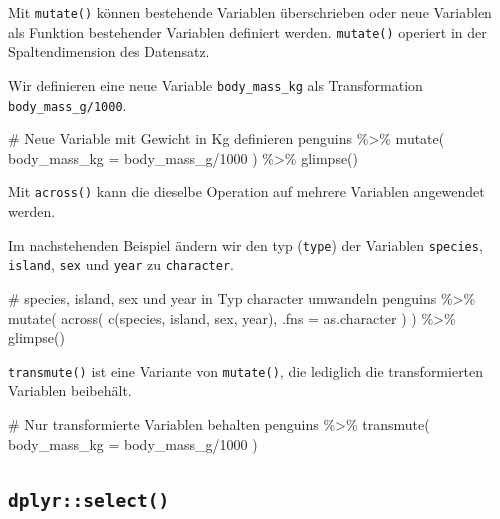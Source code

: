\documentclass[
  a4paper,
  DIV=11,
  oneside]{scrreprt}
\newenvironment{Shaded}{\begin{snugshade}}{\end{snugshade}}
\newcommand{\NormalTok}[1]{\textcolor[rgb]{0.00,0.23,0.31}{#1}}
\begin{document}
Mit \texttt{mutate()} können bestehende Variablen überschrieben oder
neue Variablen als Funktion bestehender Variablen definiert werden.
\texttt{mutate()} operiert in der Spaltendimension des Datensatz.

Wir definieren eine neue Variable \texttt{body\_mass\_kg} als
Transformation \texttt{body\_mass\_g/1000}.

\begin{Shaded}
\begin{Highlighting}[]
\NormalTok{\# Neue Variable mit Gewicht in Kg definieren}
\NormalTok{penguins \%\textgreater{}\% }
\NormalTok{  mutate(}
\NormalTok{    body\_mass\_kg = body\_mass\_g/1000}
\NormalTok{  ) \%\textgreater{}\%}
\NormalTok{  glimpse()}
\end{Highlighting}
\end{Shaded}

Mit \texttt{across()} kann die dieselbe Operation auf mehrere Variablen
angewendet werden.

Im nachstehenden Beispiel ändern wir den typ (\texttt{type}) der
Variablen \texttt{species}, \texttt{island}, \texttt{sex} und
\texttt{year} zu \texttt{character}.

\begin{Shaded}
\begin{Highlighting}[]
\NormalTok{\# species, island, sex und year in Typ \textquotesingle{}character\textquotesingle{} umwandeln}
\NormalTok{penguins \%\textgreater{}\% }
\NormalTok{  mutate(}
\NormalTok{    across(}
\NormalTok{      c(species, island, sex, year), }
\NormalTok{      .fns = as.character}
\NormalTok{    )}
\NormalTok{  ) \%\textgreater{}\%}
\NormalTok{  glimpse()}
\end{Highlighting}
\end{Shaded}

\texttt{transmute()} ist eine Variante von \texttt{mutate()}, die
lediglich die transformierten Variablen beibehält.

\begin{Shaded}
\begin{Highlighting}[]
\NormalTok{\# Nur transformierte Variablen behalten}
\NormalTok{penguins \%\textgreater{}\% }
\NormalTok{  transmute(}
\NormalTok{    body\_mass\_kg = body\_mass\_g/1000}
\NormalTok{  )}
\end{Highlighting}
\end{Shaded}

\hypertarget{dplyrselect}{%
\subsection{\texorpdfstring{\texttt{dplyr::select()}}{dplyr::select()}}\label{dplyrselect}}
\end{document}
